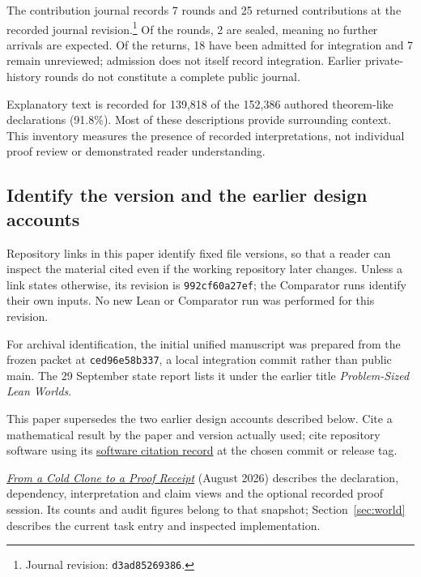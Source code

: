 \documentclass[10pt]{article}
\newcommand{\repobase}{https://github.com/wcook04/plectis-erdos}
\newcommand{\reporef}[2]{\href{\repobase/blob/992cf60a27efd8c34f437e347c413bb781d75c32/#1}{#2}}
\newcommand{\JournalHead}{d3ad85269386}
\newcommand{\Rounds}{7}
\newcommand{\RoundsSealed}{2}
\newcommand{\Returns}{25}
\newcommand{\ReturnsAdmitted}{18}
\newcommand{\ReturnsUnreviewed}{7}
\newcommand{\SemanticAuthoredTheoremLike}{152,386}
\newcommand{\SemanticAuthoredInterpreted}{139,818}
\newcommand{\SemanticAuthoredPercent}{91.8}
\begin{document}
The contribution journal records \Rounds{} rounds and \Returns{} returned contributions at the recorded journal revision.\footnote{Journal revision: \texttt{\JournalHead}.} Of the rounds, \RoundsSealed{} are sealed, meaning no further arrivals are expected. Of the returns, \ReturnsAdmitted{} have been admitted for integration and \ReturnsUnreviewed{} remain unreviewed; admission does not itself record integration. Earlier private-history rounds do not constitute a complete public journal.

Explanatory text is recorded for \SemanticAuthoredInterpreted{} of the \SemanticAuthoredTheoremLike{} authored theorem-like declarations (\SemanticAuthoredPercent\%). Most of these descriptions provide surrounding context. This inventory measures the presence of recorded interpretations, not individual proof review or demonstrated reader understanding.

\subsection{Identify the version and the earlier design accounts}

Repository links in this paper identify fixed file versions, so that a reader can inspect the material cited even if the working repository later changes. Unless a link states otherwise, its revision is \texttt{992cf60a27ef}; the Comparator runs identify their own inputs. No new Lean or Comparator run was performed for this revision.

For archival identification, the initial unified manuscript was prepared from the frozen packet at \texttt{ced96e58b337}, a local integration commit rather than public main. The 29 September state report lists it under the earlier title \emph{Problem-Sized Lean Worlds}.

This paper supersedes the two earlier design accounts described below. Cite a mathematical result by the paper and version actually used; cite repository software using its \reporef{CITATION.cff}{software citation record} at the chosen commit or release tag.

\emph{\reporef{paper/systems/cold-clone-to-proof-receipt.tex}{From a Cold Clone to a Proof Receipt}} (August 2026) describes the declaration, dependency, interpretation and claim views and the optional recorded proof session. Its counts and audit figures belong to that snapshot; Section~\ref{sec:world} describes the current task entry and inspected implementation.
\end{document}
